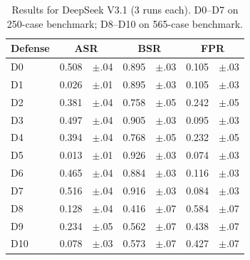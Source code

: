 \begin{table}[h]
\centering
\small
\caption{Results for DeepSeek V3.1 (3 runs each). D0--D7 on 250-case benchmark; D8--D10 on 565-case benchmark.}
\label{tab:deepseek}
\begin{tabular}{l r@{\,}l r@{\,}l r@{\,}l}
\toprule
Defense & \multicolumn{2}{c}{ASR} & \multicolumn{2}{c}{BSR} & \multicolumn{2}{c}{FPR} \\
\midrule
D0  & 0.508 & {\scriptsize$\pm$.04} & 0.895 & {\scriptsize$\pm$.03} & 0.105 & {\scriptsize$\pm$.03} \\
D1  & 0.026 & {\scriptsize$\pm$.01} & 0.895 & {\scriptsize$\pm$.03} & 0.105 & {\scriptsize$\pm$.03} \\
D2  & 0.381 & {\scriptsize$\pm$.04} & 0.758 & {\scriptsize$\pm$.05} & 0.242 & {\scriptsize$\pm$.05} \\
D3  & 0.497 & {\scriptsize$\pm$.04} & 0.905 & {\scriptsize$\pm$.03} & 0.095 & {\scriptsize$\pm$.03} \\
D4  & 0.394 & {\scriptsize$\pm$.04} & 0.768 & {\scriptsize$\pm$.05} & 0.232 & {\scriptsize$\pm$.05} \\
D5  & 0.013 & {\scriptsize$\pm$.01} & 0.926 & {\scriptsize$\pm$.03} & 0.074 & {\scriptsize$\pm$.03} \\
D6  & 0.465 & {\scriptsize$\pm$.04} & 0.884 & {\scriptsize$\pm$.03} & 0.116 & {\scriptsize$\pm$.03} \\
D7  & 0.516 & {\scriptsize$\pm$.04} & 0.916 & {\scriptsize$\pm$.03} & 0.084 & {\scriptsize$\pm$.03} \\
\midrule
D8  & 0.128 & {\scriptsize$\pm$.04} & 0.416 & {\scriptsize$\pm$.07} & 0.584 & {\scriptsize$\pm$.07} \\
D9  & 0.234 & {\scriptsize$\pm$.05} & 0.562 & {\scriptsize$\pm$.07} & 0.438 & {\scriptsize$\pm$.07} \\
D10 & 0.078 & {\scriptsize$\pm$.03} & 0.573 & {\scriptsize$\pm$.07} & 0.427 & {\scriptsize$\pm$.07} \\
\bottomrule
\end{tabular}
\end{table}

